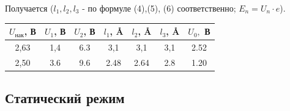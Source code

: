 \documentclass[a4paper,12pt]{article}
\begin{document}
Получается ($l_1, l_2, l_3$ - по формуле (4),(5), (6) соответственно; $E_n = U_n \cdot e$). 

\begin{table}[H]
\centering
\begin{tabular}{|c|c|c|c|c|c|c|}
\hline
$U_\text{нак}$, В & $U_1$, В & $U_2$, В & $l_1$, \AA & $l_2$, \AA & $l_3$, \AA & $U_0,$ В \\
\hline
2,63 & 1,4 & 6.3 & 3,1 & 3,1 & 3,1 & 2.52 \\
\hline
2,50 & 3.6 & 9.6 & 2.48 & 2.64 & 2.8 & 1.20 \\
\hline
\end{tabular}
\end{table}

\subsection*{Статический режим}
\end{document}
